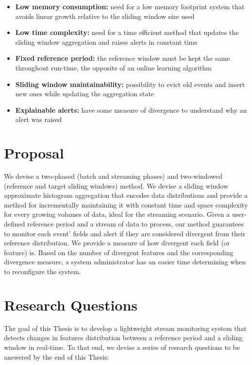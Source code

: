 \begin{itemize}
    \item \textbf{Low memory consumption:} need for a low memory footprint system that avoids linear growth relative to the sliding window size used
    
    \item \textbf{Low time complexity:} need for a time efficient method that updates the sliding window aggregation and raises alerts in constant time
    
    \item \textbf{Fixed reference period:} the reference window must be kept the same throughout run-time, the opposite of an online learning algorithm
    
    \item \textbf{Sliding window maintainability:} possibility to evict old events and insert new ones while updating the aggregation state
    
    \item \textbf{Explainable alerts:} have some measure of divergence to understand why an alert was raised
\end{itemize}


\section{Proposal}
We devise a two-phased (batch and streaming phases) and two-windowed (reference and target sliding windows) method. We devise a sliding window approximate histogram aggregation that encodes data distributions and provide a method for incrementally maintaining it with constant time and space complexity for every growing volumes of data, ideal for the streaming scenario. Given a user-defined reference period and a stream of data to process, our method guarantees to monitor each event' fields and alert if they are considered divergent from their reference distribution. We provide a measure of how divergent each field (or feature) is. Based on the number of divergent features and the corresponding divergence measure, a system administrator has an easier time determining when to reconfigure the system.


\section{Research Questions}
The goal of this Thesis is to develop a lightweight stream monitoring system that detects changes in features distribution between a reference period and a sliding window in real-time. To that end, we devise a series of research questions to be answered by the end of this Thesis:

